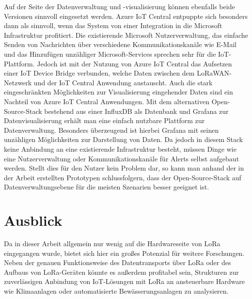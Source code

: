 Auf der Seite der Datenverwaltung und -visualisierung können ebenfalls beide Versionen sinnvoll eingesetzt werden. Azure IoT Central entpuppte sich besonders dann als sinnvoll, wenn das System von einer Integration in die Microsoft Infrastruktur profitiert. Die existierende Microsoft Nutzerverwaltung, das einfache Senden von Nachrichten über verschiedene Kommunikationskanäle wie E-Mail und das Hinzufügen unzähliger Microsoft-Services sprechen sehr für die IoT-Plattform. Jedoch ist mit der Nutzung von Azure IoT Central das Aufsetzen einer IoT Device Bridge verbunden, welche Daten zwischen dem LoRaWAN-Netzwerk und der IoT Central Anwendung austauscht. Auch die stark eingeschränkten Möglichkeiten zur Visualisierung eingehender Daten sind ein Nachteil von Azure IoT Central Anwendungen. Mit dem alternativen Open-Source-Stack bestehend aus einer InfluxDB als Datenbank und Grafana zur Datenvisualisierung erhält man eine einfach nutzbare Plattform zur Datenverwaltung. Besonders überzeugend ist hierbei Grafana mit seinen unzähligen Möglichkeiten zur Darstellung von Daten. Da jedoch in diesem Stack keine Anbindung an eine existierende Infrastruktur besteht, müssen Dinge wie eine Nutzerverwaltung oder Kommunikationskanäle für Alerts selbst aufgebaut werden. Stellt dies für den Nutzer kein Problem dar, so kann man anhand der in der Arbeit erstellten Prototypen schlussfolgern, dass der Open-Source-Stack auf Datenverwaltungsebene für die meisten Szenarien besser geeignet ist.

\section{Ausblick}

Da in dieser Arbeit allgemein nur wenig auf die Hardwareseite von LoRa eingegangen wurde, bietet sich hier ein großes Potenzial für weitere Forschungen. Neben der genauen Funktionsweise des Datentransports über LoRa oder des Aufbaus von LoRa-Geräten könnte es außerdem profitabel sein, Strukturen zur zuverlässigen Anbindung von IoT-Lösungen mit LoRa an ansteuerbare Hardware wie Klimaanlagen oder automatisierte Bewässerungsanlagen zu analysieren.